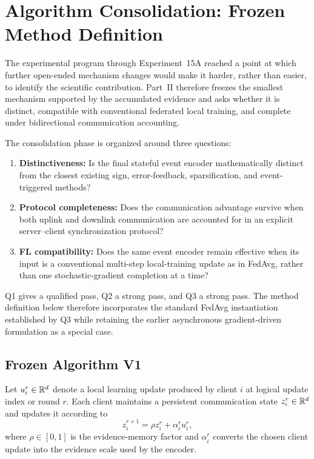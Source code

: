 \section{Algorithm Consolidation: Frozen Method Definition}
\label{sec:algorithm-consolidation}

The experimental program through Experiment~15A reached a point at which further open-ended mechanism changes would make it harder, rather than easier, to identify the scientific contribution. Part~II therefore freezes the smallest mechanism supported by the accumulated evidence and asks whether it is distinct, compatible with conventional federated local training, and complete under bidirectional communication accounting.

The consolidation phase is organized around three questions:
\begin{enumerate}
    \item \textbf{Distinctiveness:} Is the final stateful event encoder mathematically distinct from the closest existing sign, error-feedback, sparsification, and event-triggered methods?
    \item \textbf{Protocol completeness:} Does the communication advantage survive when both uplink and downlink communication are accounted for in an explicit server--client synchronization protocol?
    \item \textbf{FL compatibility:} Does the same event encoder remain effective when its input is a conventional multi-step local-training update as in FedAvg, rather than one stochastic-gradient completion at a time?
\end{enumerate}
Q1 gives a qualified pass, Q2 a strong pass, and Q3 a strong pass. The method definition below therefore incorporates the standard FedAvg instantiation established by Q3 while retaining the earlier asynchronous gradient-driven formulation as a special case.

\subsection{Frozen Algorithm V1}

Let $u_i^r\in\mathbb{R}^d$ denote a local learning update produced by client $i$ at logical update index or round $r$. Each client maintains a persistent communication state $z_i^r\in\mathbb{R}^d$ and updates it according to
\begin{equation}
    z_i^{r+1}=\rho z_i^r+\alpha_i^r u_i^r,
    \label{eq:consolidated-state}
\end{equation}
where $\rho\in[0,1]$ is the evidence-memory factor and $\alpha_i^r$ converts the chosen client update into the evidence scale used by the encoder.


